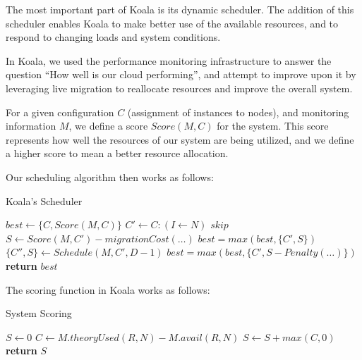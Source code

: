 The most important part of Koala is its dynamic scheduler.  The addition of this
scheduler enables Koala to make better use of the available resources, and to
respond to changing loads and system conditions.

In Koala, we used the performance monitoring infrastructure to answer the
question ``How well is our cloud performing'', and attempt to improve upon it by
leveraging live migration to reallocate resources and improve the overall
system.

For a given configuration $C$ (assignment of instances to nodes), and
monitoring information $M$, we define a score $Score(M,C)$ for the system.  This
score represents how well the resources of our system are being utilized, and we
define a higher score to mean a better resource allocation.

Our scheduling algorithm then works as follows:

\begin{algorithm}
\caption{Koala's Scheduler}
\label{algo:sched}
\footnotesize
\begin{algorithmic}
    \State $best \gets \{C,Score(M,C)\}$%
        \State $C' \gets C : (I \gets N)$
            \State $skip$
        \EndIf
        \State $S \gets Score(M,C') - migrationCost(\dots)$
        \State $best = max(best,\{C',S\})$
        \State $\{C'',S\} \gets Schedule(M,C',D-1)$
        \State $best = max(best,\{C', S - Penalty(\dots)\})$
        \EndIf
    \EndFor
    \State \textbf{return} $best$
\EndProcedure
\end{algorithmic}
\normalsize
\end{algorithm}

The scoring function in Koala works as follows:

\begin{algorithm}
\caption{System Scoring}
\label{algo:score}
\footnotesize
\begin{algorithmic}
    \State $S \gets 0$
        \State $C \gets M.theoryUsed(R,N) - M.avail(R,N)$
        \State $S \gets S + max(C,0)$
    \EndFor
    \State \textbf{return} $S$
\EndProcedure
\end{algorithmic}
\normalsize
\end{algorithm}

